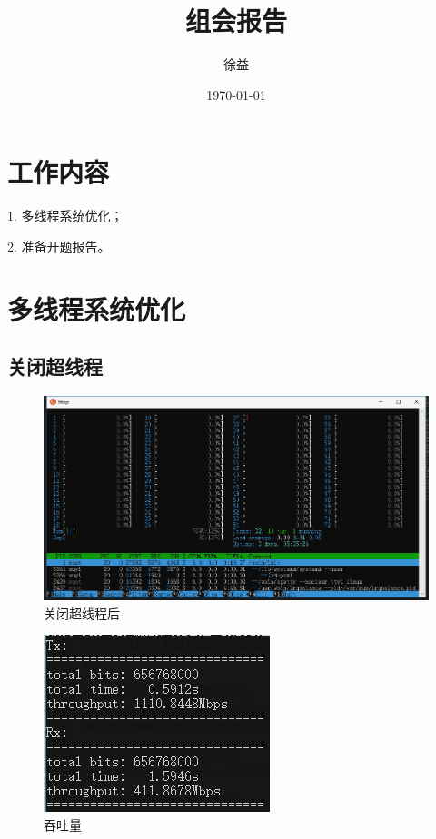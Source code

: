 \documentclass{article}
\title{组会报告}
\author{徐益}
\date{\today}
\begin{document}
\maketitle


\section{工作内容}
1. 多线程系统优化；

2. 准备开题报告。

\section{多线程系统优化}
\subsection{关闭超线程}
\begin{figure}[H]
	\centering
	\includegraphics[width = \textwidth]{htop.png}
	\caption{关闭超线程后}
\end{figure}
\begin{figure}[H]
	\centering
	\includegraphics[width = .4\textwidth]{ht.png}
	\caption{吞吐量}
\end{figure}
\end{document}
